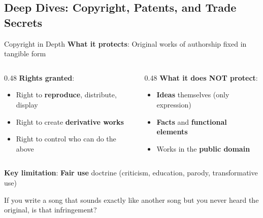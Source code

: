 ﻿\documentclass[aspectratio=169,11pt]{beamer}
\begin{document}
\subsection{Deep Dives: Copyright, Patents, and Trade Secrets}
\begin{frame}{Copyright in Depth}
\textbf{What it protects}: Original works of authorship fixed in tangible form

\vspace{0.2cm}
\begin{columns}[T]
\begin{column}{0.48\textwidth}
\textbf{Rights granted}:
\begin{itemize}
    \item Right to \textbf{reproduce}, distribute, display
    \item Right to create \textbf{derivative works}
    \item Right to control who can do the above
\end{itemize}
\end{column}

\begin{column}{0.48\textwidth}
\textbf{What it does NOT protect}:
\begin{itemize}
    \item \textbf{Ideas} themselves (only expression)
    \item \textbf{Facts} and \textbf{functional elements}
    \item Works in the \textbf{public domain}
\end{itemize}
\end{column}
\end{columns}

\vspace{0.3cm}
\textbf{Key limitation}: \textbf{Fair use} doctrine (criticism, education, parody, transformative use)

\begin{discussionbox}[Discussion]
If you write a song that sounds exactly like another song but you never heard the original, is that infringement?
\end{discussionbox}
\end{frame}
\end{document}
